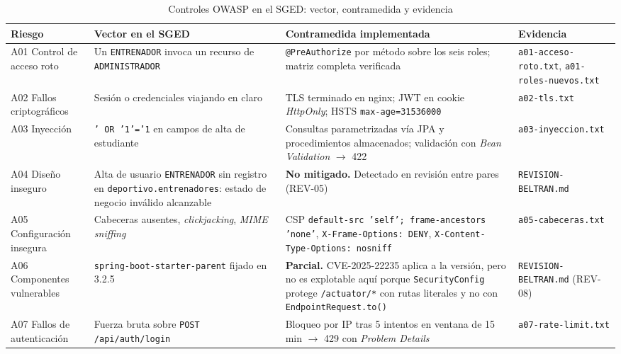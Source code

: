 \documentclass[12pt,a4paper]{article}
\begin{document}
\begin{table}[h!]
  \centering
  \caption{Controles OWASP en el SGED: vector, contramedida y evidencia}
  \label{tab:owasp}
  \begin{tabularx}{\linewidth}{@{}L{2.3cm}L{3.6cm}L{4.4cm}L{3.1cm}@{}}
    \toprule
    \textbf{Riesgo} & \textbf{Vector en el SGED} & \textbf{Contramedida implementada} &
    \textbf{Evidencia} \\
    \midrule
    A01 Control de acceso roto &
      Un \texttt{ENTRENADOR} invoca un recurso de \texttt{ADMINISTRADOR} &
      \texttt{@PreAuthorize} por método sobre los seis roles; matriz completa verificada &
      \texttt{a01-acceso-roto.txt}, \texttt{a01-roles-nuevos.txt} \\[3pt]
    A02 Fallos criptográficos &
      Sesión o credenciales viajando en claro &
      TLS terminado en nginx; JWT en cookie \textit{HttpOnly}; HSTS \texttt{max-age=31536000} &
      \texttt{a02-tls.txt} \\[3pt]
    A03 Inyección &
      \texttt{' OR '1'='1} en campos de alta de estudiante &
      Consultas parametrizadas vía JPA y procedimientos almacenados; validación con
      \textit{Bean Validation} $\rightarrow$ 422 &
      \texttt{a03-inyeccion.txt} \\[3pt]
    A04 Diseño inseguro &
      Alta de usuario \texttt{ENTRENADOR} sin registro en \texttt{deportivo.entrenadores}:
      estado de negocio inválido alcanzable &
      \textbf{No mitigado.} Detectado en revisión entre pares (REV-05) &
      \texttt{REVISION-BELTRAN.md} \\[3pt]
    A05 Configuración insegura &
      Cabeceras ausentes, \textit{clickjacking}, \textit{MIME sniffing} &
      CSP \texttt{default-src 'self'; frame-ancestors 'none'},
      \texttt{X-Frame-Options: DENY}, \texttt{X-Content-Type-Options: nosniff} &
      \texttt{a05-cabeceras.txt} \\[3pt]
    A06 Componentes vulnerables &
      \texttt{spring-boot-starter-parent} fijado en 3.2.5 &
      \textbf{Parcial.} CVE-2025-22235 aplica a la versión, pero no es explotable aquí porque
      \texttt{SecurityConfig} protege \texttt{/actuator/*} con rutas literales y no con
      \texttt{EndpointRequest.to()} &
      \texttt{REVISION-BELTRAN.md} (REV-08) \\[3pt]
    A07 Fallos de autenticación &
      Fuerza bruta sobre \texttt{POST /api/auth/login} &
      Bloqueo por IP tras 5 intentos en ventana de 15 min $\rightarrow$ 429 con
      \textit{Problem Details} &
      \texttt{a07-rate-limit.txt} \\[3pt]

\end{tabularx}
\end{table}
\end{document}
